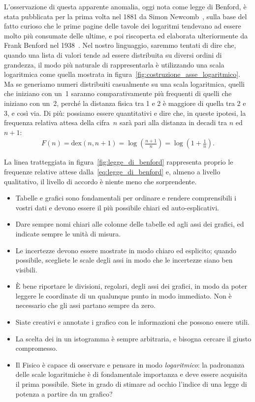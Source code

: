 L'osservazione di questa apparente anomalia, oggi nota come legge di Benford, è stata
pubblicata per la prima volta nel 1881 da Simon Newcomb~\cite{newcomb}, sulla base
del fatto curioso che le prime pagine delle tavole dei logaritmi tendevano ad
essere molto più consumate delle ultime, e poi riscoperta ed elaborata ulteriormente
da Frank Benford nel 1938~\cite{benford}. Nel nostro linguaggio, saremmo tentati
di dire che, quando una lista di valori tende ad essere distribuita su diversi
ordini di grandezza, il modo più naturale di rappresentarla è utilizzando una
scala logaritmica come quella mostrata in figura~\ref{fig:costruzione_asse_logaritmico}.
Ma se generiamo numeri distribuiti casualmente su una scala logaritmica, quelli
che iniziano con un~1 saranno comparativamente più frequenti di quelli che iniziano
con un~2, perché la distanza fisica tra 1 e 2 è maggiore di quella tra 2 e 3, e
così via. Di più: possiamo essere quantitativi e dire che, in queste ipotesi, la
frequenza relativa attesa della cifra~$n$ sarà pari alla distanza in decadi
tra $n$ ed $n + 1$:
\begin{align}\label{eq:legge_di_benford}
  F(n) = \text{dex}(n, n + 1) = \log \left(\frac{n + 1}{n}\right) =
  \log \left(1 + \frac{1}{n}\right).
\end{align}

La linea tratteggiata in figura~\ref{fig:legge_di_benford} rappresenta proprio
le frequenze relative attese dalla~\ref{eq:legge_di_benford} e, almeno a livello
qualitativo, il livello di accordo è niente meno che sorprendente.


\summary

\begin{itemize}
\item Tabelle e grafici sono fondamentali per ordinare e rendere comprensibili
  i vostri dati e devono essere il più possibile chiari ed auto-esplicativi.
\item Dare sempre nomi chiari alle colonne delle tabelle ed
  agli assi dei grafici, ed indicate sempre le unità di misura.
\item Le incertezze devono essere mostrate in modo chiaro ed esplicito; quando
  possibile, scegliete le scale degli assi in modo che le incertezze siano ben visibili.
\item \`E bene riportare le divisioni, regolari, degli assi dei grafici,
  in modo da poter leggere le coordinate di un qualunque punto in modo
  immediato. Non è necessario che gli assi partano sempre da zero.
\item Siate creativi e annotate i grafico con le informazioni che possono essere utili.
\item La scelta dei  in un istogramma è sempre arbitraria, e
  bisogna cercare il giusto compromesso.
\item Il Fisico è capace di osservare e pensare in modo \emph{logaritmico}:
  la padronanza delle scale logaritmiche è di fondamentale importanza e deve
  essere acquisita il prima possibile. Siete in grado di stimare ad occhio l'indice
  di una legge di potenza a partire da un grafico?
\end{itemize}
